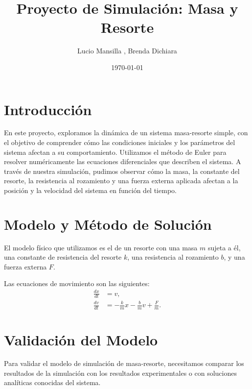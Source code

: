 \documentclass{article}
\title{Proyecto de Simulación: Masa y Resorte}
\author{Lucio Mansilla , Brenda Dichiara}
\date{\today}
\begin{document}
\maketitle

\section{Introducción}
En este proyecto, exploramos la dinámica de un sistema masa-resorte simple, con el objetivo de comprender cómo las condiciones iniciales y los parámetros del sistema afectan a su comportamiento. Utilizamos el método de Euler para resolver numéricamente las ecuaciones diferenciales que describen el sistema. A través de nuestra simulación, pudimos observar cómo la masa, la constante del resorte, la resistencia al rozamiento y una fuerza externa aplicada afectan a la posición y la velocidad del sistema en función del tiempo.

\section{Modelo y Método de Solución}
El modelo físico que utilizamos es el de un resorte con una masa $m$ sujeta a él, una constante de resistencia del resorte $k$, una resistencia al rozamiento $b$, y una fuerza externa $F$. 


Las ecuaciones de movimiento son las siguientes:
\begin{align*}
\frac{dx}{dt} & = v, \\
\frac{dv}{dt} & = -\frac{k}{m}x - \frac{b}{m}v + \frac{F}{m}.
\end{align*}


\section{Validación del Modelo}
Para validar el modelo de simulación de masa-resorte, necesitamos comparar los resultados de la simulación con los resultados experimentales o con soluciones analíticas conocidas del sistema.
\end{document}
